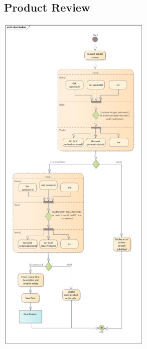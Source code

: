 \subsection{Product Review}
\begin{center}
  \includegraphics[width=0.55\textwidth]{immagini/Analisi/ActivityDiagrams/ProductReview.png}
\end{center}

